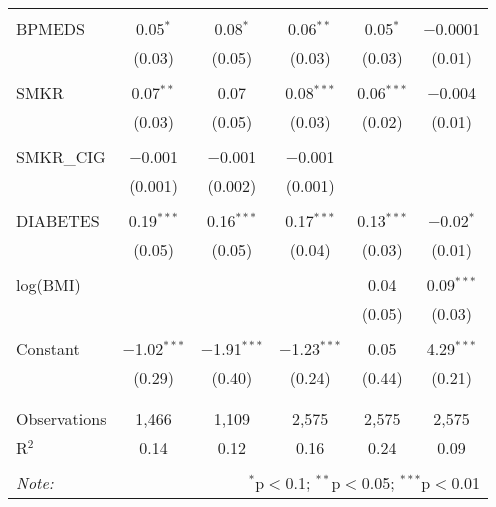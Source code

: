 \begin{table}[!htbp]
\begin{tabular}{@{\extracolsep{1pt}}lccccc}
  & & & & & \\ 
 BPMEDS & 0.05$^{*}$ & 0.08$^{*}$ & 0.06$^{**}$ & 0.05$^{*}$ & $-$0.0001 \\ 
  & (0.03) & (0.05) & (0.03) & (0.03) & (0.01) \\ 
  & & & & & \\ 
 SMKR & 0.07$^{**}$ & 0.07 & 0.08$^{***}$ & 0.06$^{***}$ & $-$0.004 \\ 
  & (0.03) & (0.05) & (0.03) & (0.02) & (0.01) \\ 
  & & & & & \\ 
 SMKR\_CIG & $-$0.001 & $-$0.001 & $-$0.001 &  &  \\ 
  & (0.001) & (0.002) & (0.001) &  &  \\ 
  & & & & & \\ 
 DIABETES & 0.19$^{***}$ & 0.16$^{***}$ & 0.17$^{***}$ & 0.13$^{***}$ & $-$0.02$^{*}$ \\ 
  & (0.05) & (0.05) & (0.04) & (0.03) & (0.01) \\ 
  & & & & & \\ 
 log(BMI) &  &  &  & 0.04 & 0.09$^{***}$ \\ 
  &  &  &  & (0.05) & (0.03) \\ 
  & & & & & \\ 
 Constant & $-$1.02$^{***}$ & $-$1.91$^{***}$ & $-$1.23$^{***}$ & 0.05 & 4.29$^{***}$ \\ 
  & (0.29) & (0.40) & (0.24) & (0.44) & (0.21) \\ 
  & & & & & \\ 
\hline \\[-1.8ex] 
Observations & 1,466 & 1,109 & 2,575 & 2,575 & 2,575 \\ 
R$^{2}$ & 0.14 & 0.12 & 0.16 & 0.24 & 0.09 \\ 
\hline 
\hline \\[-1.8ex] 
\textit{Note:}  & \multicolumn{5}{r}{$^{*}$p$<$0.1; $^{**}$p$<$0.05; $^{***}$p$<$0.01} \\ 
\end{tabular} 
\end{table} 
